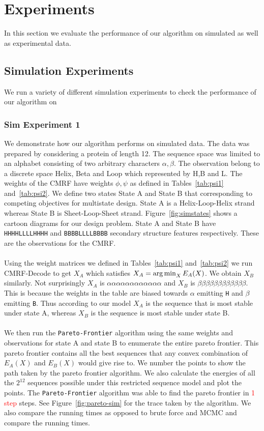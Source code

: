 \section{Experiments}
In this section we evaluate the performance of our algorithm on simulated as well as experimental data. 

\subsection{Simulation Experiments}
We run a variety of different simulation experiments to check the performance of our algorithm on 

\subsubsection{Sim Experiment 1}
\label{sim:toy}
We demonstrate how our algorithm performs on simulated data. The data was prepared by considering a protein of length 12. The sequence space was limited to an alphabet consisting of two arbitrary characters $\alpha,\beta$. The observation belong to a discrete space Helix, Beta and Loop which represented by H,B and L. The weights of the CMRF have weights $\phi,\psi$ as defined in Tables~\ref{tab:psi1} and~\ref{tab:psi2}. We define two states State A and State B that corresponding to competing objectives for multistate design. State A is a Helix-Loop-Helix strand whereas State B is Sheet-Loop-Sheet strand. Figure~\ref{fig:simstates} shows a cartoon diagrams for our design problem. State A and State B have \texttt{HHHHLLLLHHHH} and \texttt{BBBBLLLLBBBB} secondary structure features respectively. These are the observations for the CMRF.
\\
\\
Using the weight matrices we defined in Tables~\ref{tab:psi1} and~\ref{tab:psi2} we run CMRF-Decode to get $X_A$ which satisfies $X_A = \operatorname*{arg\,min}_X E_A(X)$. We obtain $X_B$ similarly. Not surprisingly $X_A$ is $\alpha\alpha\alpha\alpha\alpha\alpha\alpha\alpha\alpha\alpha\alpha\alpha$ 
and $X_B$ is $\beta\beta\beta\beta\beta\beta\beta\beta\beta\beta\beta\beta$. This is because the weights in the table are biased towards $\alpha$ emitting \texttt{H} and $\beta$ emitting \texttt{B}. Thus according to our model $X_A$ is the sequence that is most stable under state A, whereas $X_B$ is the sequence is most stable under state B.
\\
\\
We then run the \texttt{Pareto-Frontier} algorithm using the same weights and observations for state A and state B to enumerate the entire pareto frontier. This pareto frontier contains all the best sequences that any convex combination of $E_A(X)$ and $E_B(X)$ would give rise to. We number the points to show the path taken by the pareto frontier algorithm. We also calculate the energies of all the $2^{12}$ sequences possible under this restricted sequence model and plot the points. The \texttt{Pareto-Frontier} algorithm was able to find the pareto frontier in \textcolor{red}{1 step} steps. See Figure~\ref{fig:pareto-sim} for the trace taken by the algorithm.  We also compare the running times as opposed to brute force and MCMC and compare the running times. 


